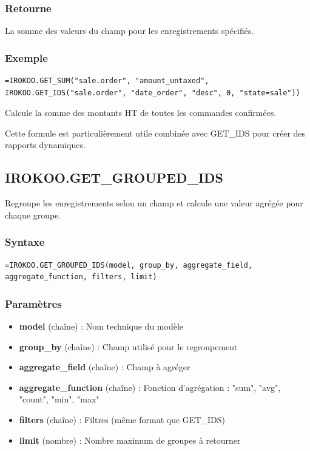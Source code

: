 \documentclass[12pt, a4paper]{article}
\begin{document}
\subsubsection{Retourne}
La somme des valeurs du champ pour les enregistrements spécifiés.

\subsubsection{Exemple}
\begin{lstlisting}
=IROKOO.GET_SUM("sale.order", "amount_untaxed", IROKOO.GET_IDS("sale.order", "date_order", "desc", 0, "state=sale"))
\end{lstlisting}
Calcule la somme des montants HT de toutes les commandes confirmées.

\begin{note}
Cette formule est particulièrement utile combinée avec GET\_IDS pour créer des rapports dynamiques.
\end{note}

\subsection{IROKOO.GET\_GROUPED\_IDS}
\begin{tcolorbox}[title=Description]
Regroupe les enregistrements selon un champ et calcule une valeur agrégée pour chaque groupe.
\end{tcolorbox}

\subsubsection{Syntaxe}
\begin{lstlisting}
=IROKOO.GET_GROUPED_IDS(model, group_by, aggregate_field, aggregate_function, filters, limit)
\end{lstlisting}

\subsubsection{Paramètres}
\begin{itemize}
    \item \textbf{model} (chaîne) : Nom technique du modèle
    \item \textbf{group\_by} (chaîne) : Champ utilisé pour le regroupement
    \item \textbf{aggregate\_field} (chaîne) : Champ à agréger
    \item \textbf{aggregate\_function} (chaîne) : Fonction d'agrégation : "sum", "avg", "count", "min", "max"
    \item \textbf{filters} (chaîne) : Filtres (même format que GET\_IDS)
    \item \textbf{limit} (nombre) : Nombre maximum de groupes à retourner
\end{itemize}
\end{document}
